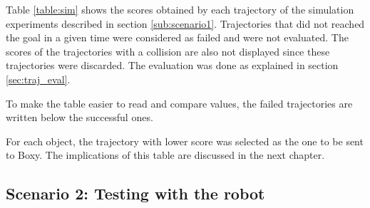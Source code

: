 Table \ref{table:sim} shows the scores obtained by each trajectory of the simulation experiments described in section \ref{sub:scenario1}.   Trajectories that did not reached the goal in a given time were considered as failed and were not evaluated. The scores of the trajectories with a collision are also not displayed since these trajectories were discarded. The evaluation was done as explained in section \ref{sec:traj_eval}.

To make the table easier to read and compare values, the failed trajectories are written below the successful ones.


\vspace{-25pt}

For each object, the trajectory with lower score was selected as the one to be sent to Boxy. The implications of this table are discussed in the next chapter.

\subsection{Scenario 2: Testing with the robot}

